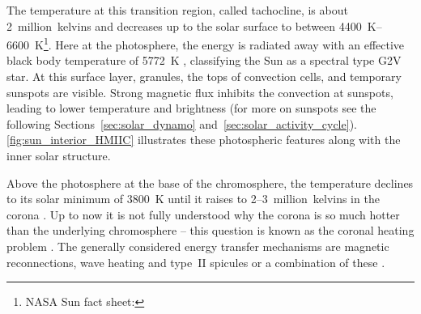 The temperature at this transition region, called tachocline, is about 2~million~kelvins and decreases up to the solar surface to between \SIrange{4400}{6600}{\K}\footnote{NASA Sun fact sheet: }. Here at the photosphere, the energy is radiated away with an effective black body temperature of \SI{5772}{\K} \citep{Mamajek2015}, classifying the Sun as a spectral type G2V star.
At this surface layer, granules, the tops of convection cells, and temporary sunspots are visible. Strong magnetic flux inhibits the convection at sunspots, leading to lower temperature and brightness (for more on sunspots see the following Sections~\ref{sec:solar_dynamo} and~\ref{sec:solar_activity_cycle}). \autoref{fig:sun_interior_HMIIC} illustrates these photospheric features along with the inner solar structure.
\begin{figure}[htb]
\end{figure}

Above the photosphere at the base of the chromosphere, the temperature declines to its solar minimum of \SI{3800}{\K} until it raises to \numrange{2}{3}~million~kelvins in the corona \citep{Billings1959,Liebenberg1975}. Up to now it is not fully understood why the corona is so much hotter than the underlying chromosphere -- this question is known as the coronal heating problem \citep{Klimchuk2006,McComas2007,Fox2015}. The generally considered energy transfer mechanisms are magnetic reconnections, wave heating and type~II spicules or a combination of these \citep{Cranmer2017}.

